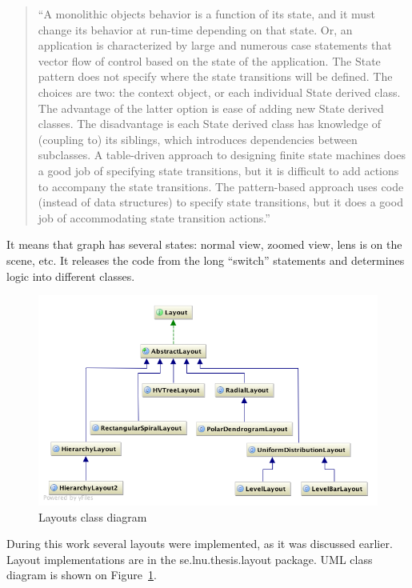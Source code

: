 \begin{quotation}
``A monolithic objects behavior is a function of its state, and it must change its behavior at run-time depending on that state.
Or, an application is characterized by large and numerous case statements that vector flow of control based on the state
of the application. The State pattern does not specify where the state transitions will be defined. The choices are two:
the context object, or each individual State derived class.
The advantage of the latter option is ease of adding new State derived classes.
The disadvantage is each State derived class has knowledge of (coupling to) its siblings,
which introduces dependencies between subclasses.
A table-driven approach to designing finite state machines does a good job of specifying state transitions,
but it is difficult to add actions to accompany the state transitions. The pattern-based approach uses code
(instead of data structures) to specify state transitions,
but it does a good job of accommodating state transition actions.''~\cite{STATE}
\end{quotation}

It means that graph has several states: normal view, zoomed view, lens is on the scene, etc.
It releases the code from the long ``switch'' statements  and determines logic into different classes.

\begin{figure}[h!]
\centering
\includegraphics[scale=0.5]{pictures/uml_layouts.png}
\caption{Layouts class diagram}
\label{fig:uml_layouts}
\end{figure}


During this work several layouts were implemented, as it was discussed earlier.
Layout implementations are in the \textsf{se.lnu.thesis.layout} package. UML class diagram is shown on Figure~\ref{fig:uml_layouts}.